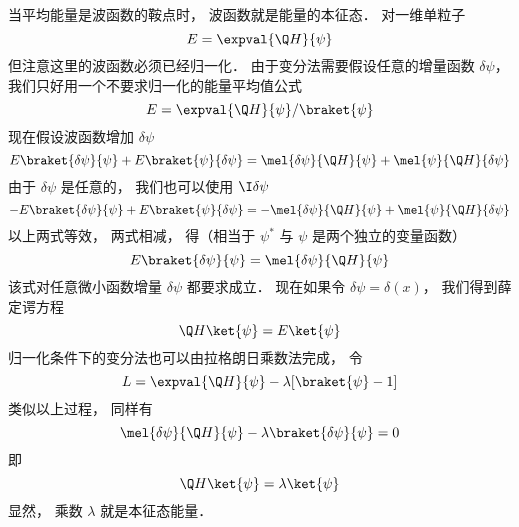 
当平均能量是波函数的鞍点时， 波函数就是能量的本征态． 对一维单粒子
\begin{equation}
E = \expval{\Q H}{\psi}
\end{equation}
但注意这里的波函数必须已经归一化． 由于变分法需要假设任意的增量函数 $\delta \psi $，  我们只好用一个不要求归一化的能量平均值公式
\begin{equation}
E = \expval{\Q H}{\psi} /\braket{\psi}
\end{equation}
现在假设波函数增加 $\delta \psi$ 
\begin{equation}
E \braket{\delta\psi}{\psi} + E\braket{\psi}{\delta\psi}
= \mel{\delta \psi}{\Q H}{\psi} + \mel{\psi}{\Q H}{\delta\psi}
\end{equation}
由于 $\delta\psi$ 是任意的， 我们也可以使用 $\I\delta\psi$ 
\begin{equation}
-E \braket{\delta\psi}{\psi} + E \braket{\psi}{\delta\psi}
= -\mel{\delta\psi}{\Q H}{\psi} + \mel{\psi}{\Q H}{\delta\psi}
\end{equation}
以上两式等效， 两式相减， 得（相当于 $\psi^*$ 与 $\psi$ 是两个独立的变量函数）
\begin{equation}
E\braket{\delta\psi}{\psi} = \mel{\delta\psi}{\Q H}{\psi}
\end{equation}
该式对任意微小函数增量 $\delta\psi $ 都要求成立． 现在如果令 $\delta \psi  = \delta (x)$，  我们得到薛定谔方程
\begin{equation}
\Q H \ket{\psi} = E\ket{\psi}
\end{equation}
归一化条件下的变分法也可以由拉格朗日乘数法完成， 令
\begin{equation}
L = \expval{\Q H}{\psi} - \lambda [\braket{\psi} - 1]
\end{equation}
类似以上过程， 同样有
\begin{equation}
\mel{\delta\psi}{\Q H}{\psi} - \lambda\braket{\delta\psi}{\psi} = 0
\end{equation}
即
\begin{equation}
\Q H \ket{\psi} = \lambda \ket{\psi}
\end{equation}
显然， 乘数 $\lambda $ 就是本征态能量．
